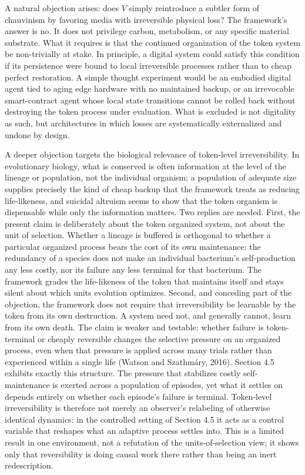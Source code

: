 \documentclass[Afour,sageh,times,doublespace]{sagej}
\begin{document}
A natural objection arises: does \(V\) simply reintroduce a subtler form of chauvinism by favoring media with irreversible physical loss? The framework's answer is no. It does not privilege carbon, metabolism, or any specific material substrate. What it requires is that the continued organization of the token system be non-trivially at stake. In principle, a digital system could satisfy this condition if its persistence were bound to local irreversible processes rather than to cheap perfect restoration. A simple thought experiment would be an embodied digital agent tied to aging edge hardware with no maintained backup, or an irrevocable smart-contract agent whose local state transitions cannot be rolled back without destroying the token process under evaluation. What is excluded is not digitality as such, but architectures in which losses are systematically externalized and undone by design.

A deeper objection targets the biological relevance of token-level irreversibility. In evolutionary biology, what is conserved is often information at the level of the lineage or population, not the individual organism; a population of adequate size supplies precisely the kind of cheap backup that the framework treats as reducing life-likeness, and suicidal altruism seems to show that the token organism is dispensable while only the information matters. Two replies are needed. First, the present claim is deliberately about the token organized system, not about the unit of selection. Whether a lineage is buffered is orthogonal to whether a particular organized process bears the cost of its own maintenance: the redundancy of a species does not make an individual bacterium's self-production any less costly, nor its failure any less terminal for that bacterium. The framework grades the life-likeness of the token that maintains itself and stays silent about which units evolution optimizes. Second, and conceding part of the objection, the framework does not require that irreversibility be learnable by the token from its own destruction. A system need not, and generally cannot, learn from its own death. The claim is weaker and testable: whether failure is token-terminal or cheaply reversible changes the selective pressure on an organized process, even when that pressure is applied across many trials rather than experienced within a single life (Watson and Szathmáry, 2016). Section 4.5 exhibits exactly this structure. The pressure that stabilizes costly self-maintenance is exerted across a population of episodes, yet what it settles on depends entirely on whether each episode's failure is terminal. Token-level irreversibility is therefore not merely an observer's relabeling of otherwise identical dynamics: in the controlled setting of Section 4.5 it acts as a control variable that reshapes what an adaptive process settles into. This is a limited result in one environment, not a refutation of the units-of-selection view; it shows only that reversibility is doing causal work there rather than being an inert redescription.
\end{document}
